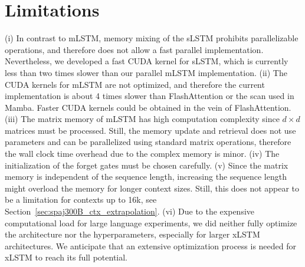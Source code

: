 \documentclass[dvipsnames]{article}
\begin{document}

\section{Limitations}

(i) In contrast to mLSTM, memory mixing of the sLSTM prohibits parallelizable operations, and therefore does not allow a fast parallel implementation.
Nevertheless, we developed a fast CUDA kernel for sLSTM, which is currently less than two times slower than our parallel mLSTM implementation.
(ii) The CUDA kernels for mLSTM are not optimized, and therefore the current implementation is about 4 times slower than FlashAttention or
the scan used in Mamba. Faster CUDA kernels could be obtained in the vein of FlashAttention. 
(iii) The matrix memory of mLSTM has high computation complexity since $d \times d$ matrices must be processed. Still, the memory update
and retrieval does not use parameters and can be parallelized using standard matrix operations, therefore the wall clock time overhead due to the complex memory is minor.
(iv) The initialization of the forget gates must be chosen carefully.
(v) Since the matrix memory is independent of the sequence length, increasing the sequence length might overload the memory for longer context sizes. Still, this does not appear to be a limitation for contexts up to 16k, 
see Section~\ref{sec:spaj300B_ctx_extrapolation}.
(vi) Due to the expensive computational load for large language experiments, 
we did neither fully optimize the architecture nor the hyperparameters, especially for larger xLSTM architectures.  
We anticipate that an extensive optimization process is needed for xLSTM to reach its full potential.


\end{document}
